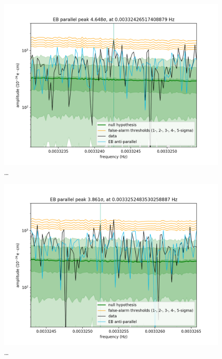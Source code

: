 \begin{figure}
  \centering
  \includegraphics[width=\linewidth]{gfx/axions/P_detection_peak_145389.png}
  \caption{\ldots}
  \label{fig:P_detection_peak_145389}
\end{figure}
\begin{figure}
  \centering
  \includegraphics[width=\linewidth]{gfx/axions/P_detection_peak_145432.png}
  \caption{\ldots}
  \label{fig:P_detection_peak_145432}
\end{figure}
